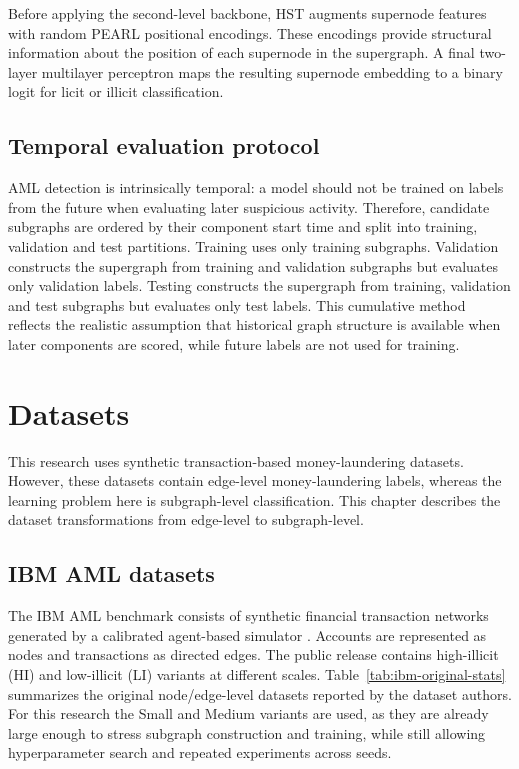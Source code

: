 \documentclass[12pt, twocolumn]{report}
\begin{document}
Before applying the second-level backbone, HST augments supernode features with random PEARL positional encodings. These encodings provide structural information about the position of each supernode in the supergraph. A final two-layer multilayer perceptron maps the resulting supernode embedding to a binary logit for licit or illicit classification.

\section{Temporal evaluation protocol}

AML detection is intrinsically temporal: a model should not be trained on labels from the future when evaluating later suspicious activity. Therefore, candidate subgraphs are ordered by their component start time and split into training, validation and test partitions. Training uses only training subgraphs. Validation constructs the supergraph from training and validation subgraphs but evaluates only validation labels. Testing constructs the supergraph from training, validation and test subgraphs but evaluates only test labels. This cumulative method reflects the realistic assumption that historical graph structure is available when later components are scored, while future labels are not used for training.

\chapter{Datasets}
\label{chap:datasets}

This research uses synthetic transaction-based money-laundering datasets. However, these datasets contain edge-level money-laundering labels, whereas the learning problem here is subgraph-level classification. This chapter describes the dataset transformations from edge-level to subgraph-level.

\section{IBM AML datasets}

The IBM AML benchmark consists of synthetic financial transaction networks generated by a calibrated agent-based simulator \cite{altman2024realistic}. Accounts are represented as nodes and transactions as directed edges. The public release contains high-illicit (HI) and low-illicit (LI) variants at different scales. Table~\ref{tab:ibm-original-stats} summarizes the original node/edge-level datasets reported by the dataset authors. For this research the Small and Medium variants are used, as they are already large enough to stress subgraph construction and training, while still allowing hyperparameter search and repeated experiments across seeds.
\end{document}
